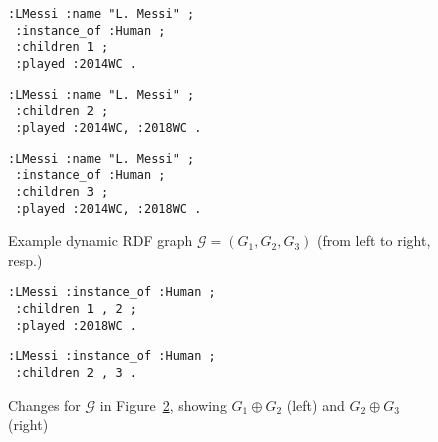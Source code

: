 \documentclass[runningheads]{llncs}
\begin{document}
%
%
%	
%	
%	
%

\begin{figure}[!t]
{\centering
	\begin{minipage}{0.32\textwidth}
	\begin{lstlisting}[style=sparqld]
:LMessi :name "L. Messi" ;
 :instance_of :Human ;
 :children 1 ;
 :played :2014WC .
	\end{lstlisting}
	\end{minipage}	
\hfill
\begin{minipage}{0.32\textwidth}
	\begin{lstlisting}[style=sparqld]
:LMessi :name "L. Messi" ;
 :children 2 ;
 :played :2014WC, :2018WC .
	\end{lstlisting}
\end{minipage}	
\hfill
\begin{minipage}{0.32\textwidth}
	\begin{lstlisting}[style=sparqld]
:LMessi :name "L. Messi" ;
 :instance_of :Human ;
 :children 3 ;
 :played :2014WC, :2018WC .
	\end{lstlisting}
\end{minipage}	
}

\caption{Example dynamic RDF graph $\mathcal{G} = (G_1, G_2, G_3)$ (from left to right, resp.) \label{fig:dg}}
\end{figure}

\begin{figure}[!t]
{\centering
\hfill
	\begin{minipage}{0.35\textwidth}
	\begin{lstlisting}[style=sparqld]
:LMessi :instance_of :Human ;
 :children 1 , 2 ;
 :played :2018WC .
	\end{lstlisting}
	\end{minipage}	
\hfill
\begin{minipage}{0.35\textwidth}
	\begin{lstlisting}[style=sparqld]
:LMessi :instance_of :Human ;
 :children 2 , 3 .
	\end{lstlisting}
\end{minipage}	
\hfill
}
\caption{Changes for $\mathcal{G}$ in Figure~\ref{fig:dgc}, showing $G_1 \oplus G_2$ (left) and $G_2 \oplus G_3$ (right) \label{fig:dgc}}
\end{figure}
\end{document}

